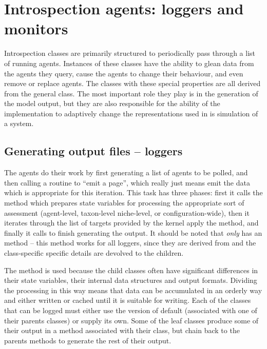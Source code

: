 \section{Introspection agents: loggers and monitors}

Introspection classes are primarily structured to periodically pass
through a list of running agents.  Instances of these classes have the
ability to glean data from the agents they query, cause the agents to
change their behaviour, and even remove or replace agents.  The
classes with these special properties are all derived from the
general  class.  The most important role they
play is in the generation of the model output, but they are also
responsible for the ability of the implementation to adaptively change the
representations used in is simulation of a system.


\subsection{Generating output files -- loggers}

The  agents do their work by first generating a list of
agents to be polled, and then calling a routine to ``emit a page'',
which really just means emit the data which is appropriate for this
iteration.  This task has three phases: first it calls the
method  which prepares state variables for
processing the appropriate sort of assessment (agent-level,
taxon-level niche-level, or configuration-wide), then it iterates
through the list of targets provided by the kernel apply
the  method, and finally it
calls  to finish generating the output.  It
should be noted that \emph{only\/}  has
an  method -- this method works for all loggers,
since they are derived from  and the class-specific
specific details are devolved to the children.

The method  is used because the child classes often
have significant differences in their state variables, their internal
data structures and output formats.  Dividing the processing in this
way means that data can be accumulated in an orderly way and either
written or cached until it is suitable for writing.  Each of the
classes that can be logged must either use the
 version of
default  (associated with one of their parents
classes) or supply its own.  Some of the leaf classes produce some of
their output in a  method associated with their
class, but chain back to the parents  methods to
generate the rest of their output.

